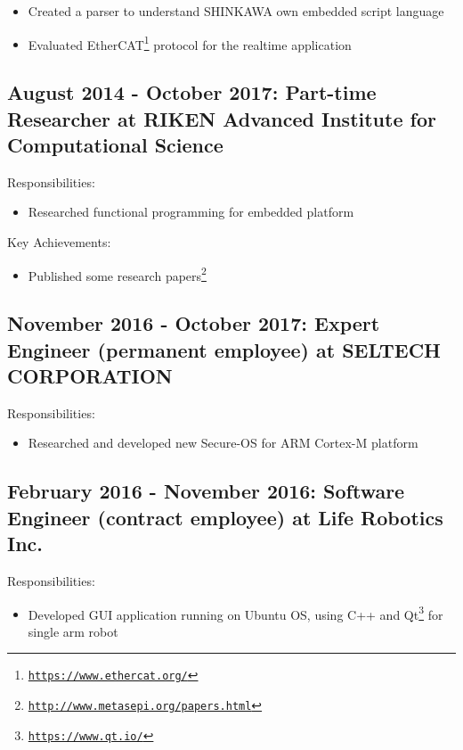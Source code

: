 \documentclass[letterpaper]{article}
\begin{document}
\begin{itemize}
  \item Created a parser to understand SHINKAWA own embedded script language
  \item Evaluated EtherCAT\footnote{\href{https://www.ethercat.org/}{\tt https://www.ethercat.org/}} protocol for the realtime application
\end{itemize}

\subsection*{August 2014 - October 2017: Part-time Researcher at RIKEN Advanced Institute for Computational Science}

\noindent Responsibilities:

\begin{itemize}
  \item Researched functional programming for embedded platform
\end{itemize}

\noindent Key Achievements:

\begin{itemize}
  \item Published some research papers\footnote{\href{http://www.metasepi.org/papers.html}{\tt http://www.metasepi.org/papers.html}}
\end{itemize}

\subsection*{November 2016 - October 2017: Expert Engineer (permanent employee) at SELTECH CORPORATION}

\noindent Responsibilities:

\begin{itemize}
  \item Researched and developed new Secure-OS for ARM Cortex-M platform
\end{itemize}

\subsection*{February 2016 - November 2016: Software Engineer (contract employee) at Life Robotics Inc.}

\noindent Responsibilities:

\begin{itemize}
  \item Developed GUI application running on Ubuntu OS, using C++ and Qt\footnote{\href{https://www.qt.io/}{\tt https://www.qt.io/}} for single arm robot
\end{itemize}
\end{document}
